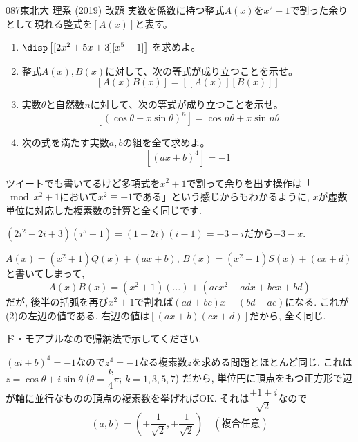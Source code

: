 \begin{thm}{087}{}{東北大 理系 (2019) 改題}
 実数を係数に持つ整式$A(x)$を$x^2+1$で割った余りとして現れる整式を$\left[A(x)\right]$と表す。
 \begin{enumerate}
  \item $\disp \left[ [2x^2+5x+3] [x^5-1] \right]$ を求めよ。
  \item 整式$A(x), B(x)$に対して、次の等式が成り立つことを示せ。
	\[ [A(x) B(x)]=\left[ [A(x)] [B(x)]\right] \]
  \item 実数$\theta$と自然数$n$に対して、次の等式が成り立つことを示せ。
	\[ \left[ (\cos\theta+x\sin\theta)^n \right] = \cos n\theta + x\sin n\theta \]
  \item 次の式を満たす実数$a, b$の組を全て求めよ。
	\[ \left[ (ax+b)^4 \right] = -1 \]
 \end{enumerate}
\end{thm}
ツイートでも書いてるけど多項式を$x^2+1$で割って余りを出す操作は「$\bmod{x^2+1}$において$x^2 \equiv -1$である」という感じからもわかるように, $x$が虚数単位に対応した複素数の計算と全く同じです. 

$(2i^2 + 2i + 3) (i^5 - 1) = (1 + 2i)(i-1) = -3 - i$だから$-3-x$. 

$A(x) = (x^2+1)Q(x)  + (ax + b)$, $B(x) = (x^2 + 1)S(x) + (cx+d)$と書いてしまって, 
\[A(x)B(x) = (x^2+1)(\dots) + (acx^2 + adx + bcx + bd) \]
だが, 後半の括弧を再び$x^2+1$で割れば$(ad + bc)x + (bd-ac)$になる. これが(2)の左辺の値である. 右辺の値は$[(ax+b)(cx+d)]$だから, 全く同じ. 

ド・モアブルなので帰納法で示してください. 

$(ai + b)^4 = - 1$なので$z^4 = -1$なる複素数$z$を求める問題とほとんど同じ. これは$z= \cos{\theta} + i\sin{\theta}$ ($\theta = \dfrac{k}{4}\pi $; $k=1,3,5,7$) だから, 単位円に頂点をもつ正方形で辺が軸に並行なものの頂点の複素数を挙げればOK. それは$\dfrac{\pm 1 \pm i}{\sqrt{2}}$なので
\[(a,b) = (\pm\dfrac{1}{\sqrt{2}},\pm\dfrac{1}{\sqrt{2}})\quad (複合任意)\]